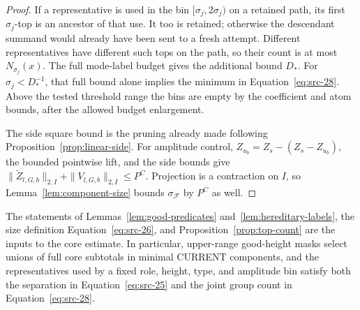 \begin{proof}
If a representative is used in the bin
\([\sigma_j,2\sigma_j)\) on a retained path, its first
\(\sigma_j\)-top is an ancestor of that use.
It too is retained; otherwise the descendant summand would
already have been sent to a fresh attempt.
Different representatives have different such tops on the path,
so their count is at most \(N_{\sigma_j}(x)\).
The full mode-label budget gives the additional bound \(D_*\).
For \(\sigma_j<D_*^{-1}\), that full bound alone implies the
minimum in Equation~\eqref{eq:src-28}.
Above the tested threshold range the bins are empty by the
coefficient and atom bounds, after the allowed budget enlargement.

The side square bound is the pruning already made following
Proposition~\ref{prop:linear-side}.
For amplitude control, \(Z_{u_b}=Z_s-(Z_s-Z_{u_b})\), the bounded
pointwise lift, and the side bounds give
\(\|\widetilde Z_{l,G,b}\|_{2,I}
 +\|V_{l,G,b}\|_{2,I}\le P^C\).
Projection is a contraction on \(I\), so
Lemma~\ref{lem:component-size} bounds
\(\sigma_{\mathcal F}\) by \(P^C\) as well.
\end{proof}

The statements of Lemmas~\ref{lem:good-predicates}
and~\ref{lem:hereditary-labels}, the size definition
Equation~\eqref{eq:src-26}, and Proposition~\ref{prop:top-count}
are the inputs to the core estimate.  In particular,
upper-range good-height masks select unions of full core
subtotals in minimal CURRENT components, and the representatives
used by a fixed role, height, type, and amplitude bin satisfy both
the separation in Equation~\eqref{eq:src-25} and the joint
group count in Equation~\eqref{eq:src-28}.
